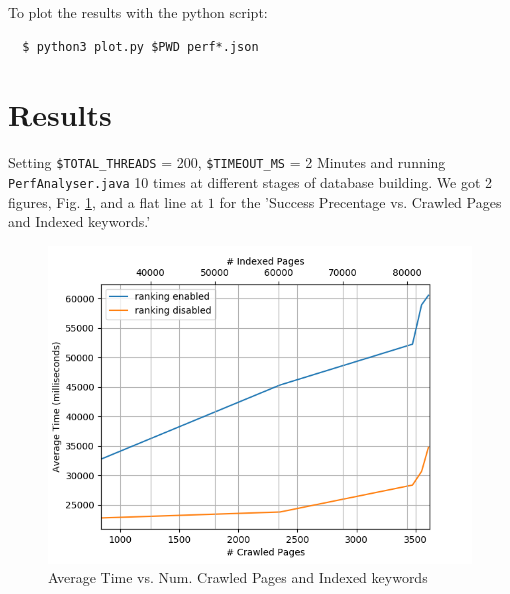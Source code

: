 \documentclass[12pt]{IEEEtran}
\begin{document}
To plot the results with the python script:
\begin{lstlisting}
  $ python3 plot.py $PWD perf*.json
\end{lstlisting}

\section{Results}
Setting \small\texttt{\$TOTAL\_THREADS} = 200, \small\texttt{\$TIMEOUT\_MS} = 2 Minutes and running \small\texttt{PerfAnalyser.java} 10 times at different stages of database building.
We got 2 figures, Fig. \ref{fig:avgtime}, and a flat line at $1$ for the 'Success Precentage vs. Crawled Pages and Indexed keywords.'

\begin{figure}
  \centering
  \includegraphics[width=\linewidth]{avgtime.png}
  \caption{Average Time vs. Num. Crawled Pages and Indexed keywords}
  \label{fig:avgtime}
\end{figure}

\end{document}
